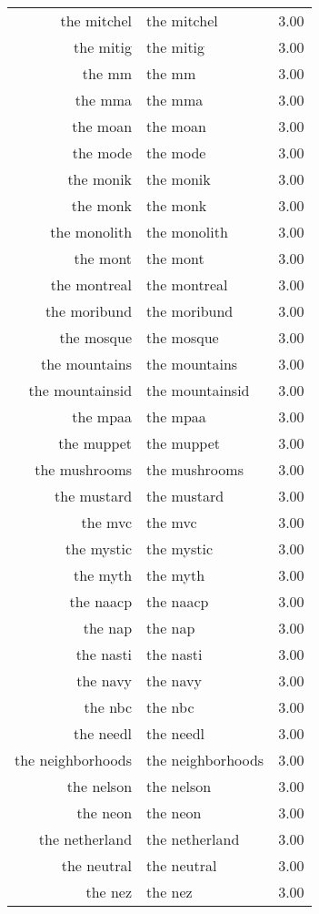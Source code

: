 \begin{table}[ht]
\begin{tabular}{rlr}
  the mitchel & the mitchel & 3.00 \\ 
  the mitig & the mitig & 3.00 \\ 
  the mm & the mm & 3.00 \\ 
  the mma & the mma & 3.00 \\ 
  the moan & the moan & 3.00 \\ 
  the mode & the mode & 3.00 \\ 
  the monik & the monik & 3.00 \\ 
  the monk & the monk & 3.00 \\ 
  the monolith & the monolith & 3.00 \\ 
  the mont & the mont & 3.00 \\ 
  the montreal & the montreal & 3.00 \\ 
  the moribund & the moribund & 3.00 \\ 
  the mosque & the mosque & 3.00 \\ 
  the mountains & the mountains & 3.00 \\ 
  the mountainsid & the mountainsid & 3.00 \\ 
  the mpaa & the mpaa & 3.00 \\ 
  the muppet & the muppet & 3.00 \\ 
  the mushrooms & the mushrooms & 3.00 \\ 
  the mustard & the mustard & 3.00 \\ 
  the mvc & the mvc & 3.00 \\ 
  the mystic & the mystic & 3.00 \\ 
  the myth & the myth & 3.00 \\ 
  the naacp & the naacp & 3.00 \\ 
  the nap & the nap & 3.00 \\ 
  the nasti & the nasti & 3.00 \\ 
  the navy & the navy & 3.00 \\ 
  the nbc & the nbc & 3.00 \\ 
  the needl & the needl & 3.00 \\ 
  the neighborhoods & the neighborhoods & 3.00 \\ 
  the nelson & the nelson & 3.00 \\ 
  the neon & the neon & 3.00 \\ 
  the netherland & the netherland & 3.00 \\ 
  the neutral & the neutral & 3.00 \\ 
  the nez & the nez & 3.00 \\ 

\end{tabular}
\end{table}
